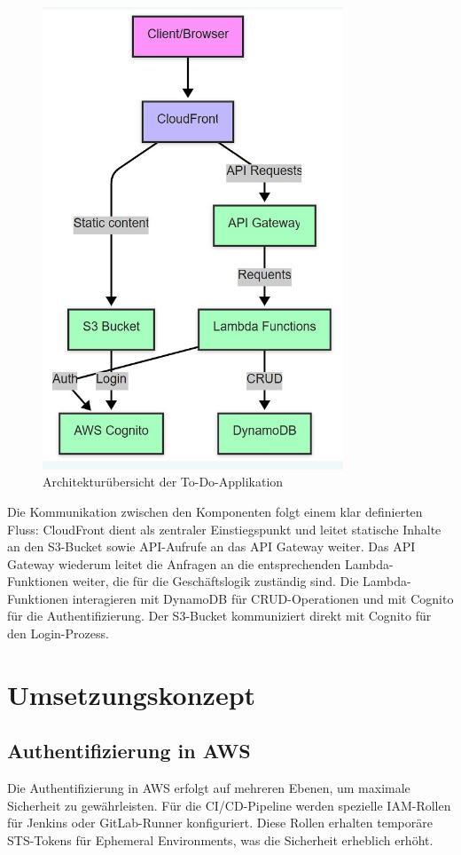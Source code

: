 \begin{figure}[h!]
\centering
\includegraphics[width=0.8\textwidth]{fig/mermaidflowChart.jpg}
\caption{Architekturübersicht der To-Do-Applikation}
\label{fig:architektur}
\end{figure}

Die Kommunikation zwischen den Komponenten folgt einem klar definierten Fluss: CloudFront dient als 
zentraler Einstiegspunkt und leitet statische Inhalte an den S3-Bucket sowie API-Aufrufe an das 
API Gateway weiter. Das API Gateway wiederum leitet die Anfragen an die entsprechenden Lambda-Funktionen 
weiter, die für die Geschäftslogik zuständig sind. Die Lambda-Funktionen interagieren mit DynamoDB 
für CRUD-Operationen und mit Cognito für die Authentifizierung. Der S3-Bucket kommuniziert direkt 
mit Cognito für den Login-Prozess.

\section{Umsetzungskonzept}
\subsection{Authentifizierung in AWS}
Die Authentifizierung in AWS erfolgt auf mehreren Ebenen, um maximale Sicherheit zu gewährleisten. 
Für die CI/CD-Pipeline werden spezielle IAM-Rollen für Jenkins oder GitLab-Runner konfiguriert. 
Diese Rollen erhalten temporäre STS-Tokens für Ephemeral Environments, was die Sicherheit 
erheblich erhöht.

